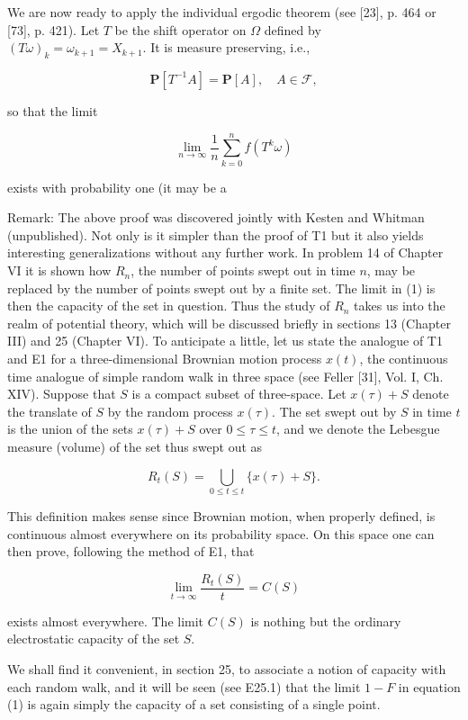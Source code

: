We are now ready to apply the individual ergodic theorem (see [23], p. 464 or [73], p. 421). Let $T$ be the shift operator on $\Omega$ defined by $(T\omega)_k = \omega_{k+1} = X_{k+1}$. It is measure preserving, i.e.,

$$\mathbf{P}[T^{-1}A] = \mathbf{P}[A], \quad A \in \mathcal{F},$$

so that the limit

$$\lim_{n \to \infty} \frac{1}{n} \sum_{k=0}^{n} f(T^k\omega)$$

exists with probability one (it may be a

Remark: The above proof was discovered jointly with Kesten and Whitman (unpublished). Not only is it simpler than the proof of T1 but it also yields interesting generalizations without any further work. In problem 14 of Chapter VI it is shown how $R_n$, the number of points swept out in time $n$, may be replaced by the number of points swept out by a finite set. The limit in (1) is then the capacity of the set in question. Thus the study of $R_n$ takes us into the realm of potential theory, which will be discussed briefly in sections 13 (Chapter III) and 25 (Chapter VI). To anticipate a little, let us state the analogue of T1 and E1 for a three-dimensional Brownian motion process $x(t)$, the continuous time analogue of simple random walk in three space (see Feller [31], Vol. I, Ch. XIV). Suppose that $S$ is a compact subset of three-space. Let $x(\tau) + S$ denote the translate of $S$ by the random process $x(\tau)$. The set swept out by $S$ in time $t$ is the union of the sets $x(\tau) + S$ over $0 \leq \tau \leq t$, and we denote the Lebesgue measure (volume) of the set thus swept out as

$$R_t(S) = \bigcup_{0 \leq t \leq t} \{x(\tau) + S\}.$$

This definition makes sense since Brownian motion, when properly defined, is continuous almost everywhere on its probability space. On this space one can then prove, following the method of E1, that

$$\lim_{t \to \infty} \frac{R_t(S)}{t} = C(S)$$

exists almost everywhere. The limit $C(S)$ is nothing but the ordinary electrostatic capacity of the set $S$.

We shall find it convenient, in section 25, to associate a notion of capacity with each random walk, and it will be seen (see E25.1) that the limit $1 - F$ in equation (1) is again simply the capacity of a set consisting of a single point.

